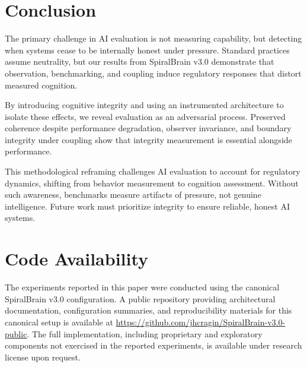 \documentclass[12pt,a4paper]{report}
\begin{document}
\section{Conclusion}

The primary challenge in AI evaluation is not measuring capability, but detecting when systems cease to be internally honest under pressure. Standard practices assume neutrality, but our results from SpiralBrain v3.0 demonstrate that observation, benchmarking, and coupling induce regulatory responses that distort measured cognition.

By introducing cognitive integrity and using an instrumented architecture to isolate these effects, we reveal evaluation as an adversarial process. Preserved coherence despite performance degradation, observer invariance, and boundary integrity under coupling show that integrity measurement is essential alongside performance.

This methodological reframing challenges AI evaluation to account for regulatory dynamics, shifting from behavior measurement to cognition assessment. Without such awareness, benchmarks measure artifacts of pressure, not genuine intelligence. Future work must prioritize integrity to ensure reliable, honest AI systems.

\section{Code Availability}

The experiments reported in this paper were conducted using the canonical SpiralBrain v3.0 configuration. A public repository providing architectural documentation, configuration summaries, and reproducibility materials for this canonical setup is available at \url{https://github.com/jhcragin/SpiralBrain-v3.0-public}. The full implementation, including proprietary and exploratory components not exercised in the reported experiments, is available under research license upon request.



\end{document}
